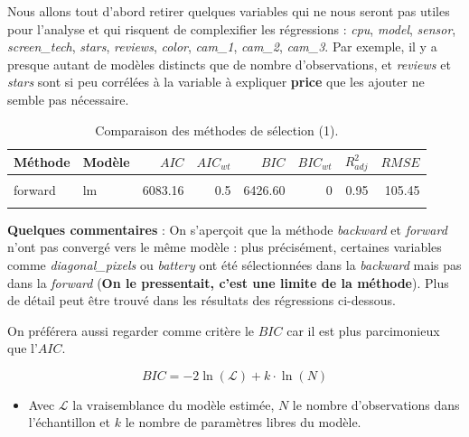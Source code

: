 \documentclass[
  12pt,
]{report}
\providecommand{\tightlist}{%
  \setlength{\itemsep}{0pt}\setlength{\parskip}{0pt}}\usepackage{longtable,booktabs,array}
\begin{document}
Nous allons tout d'abord retirer quelques variables qui ne nous seront
pas utiles pour l'analyse et qui risquent de complexifier les
régressions : \emph{cpu}, \emph{model}, \emph{sensor},
\emph{screen\_tech}, \emph{stars}, \emph{reviews}, \emph{color},
\emph{cam\_1}, \emph{cam\_2}, \emph{cam\_3}. Par exemple, il y a presque
autant de modèles distincts que de nombre d'observations, et
\emph{reviews} et \emph{stars} sont si peu corrélées à la variable à
expliquer \textbf{price} que les ajouter ne semble pas nécessaire.

\begin{table}[!h]

\caption{\label{tab:kable_perf}Comparaison des méthodes de sélection (1).}
\centering
\begin{tabular}[t]{llrrrrrr}
\toprule
\textbf{Méthode} & \textbf{Modèle} & \textbf{$AIC$} & \textbf{$AIC_{wt}$} & \textbf{$BIC$} & \textbf{$BIC_{wt}$} & \textbf{$R^2_{adj}$} & \textbf{$RMSE$}\\
\midrule
\cellcolor{gray!6}{backward} & \cellcolor{gray!6}{lm} & \cellcolor{gray!6}{6083.16} & \cellcolor{gray!6}{0.5} & \cellcolor{gray!6}{6426.60} & \cellcolor{gray!6}{0} & \cellcolor{gray!6}{0.95} & \cellcolor{gray!6}{105.45}\\
forward & lm & 6083.16 & 0.5 & 6426.60 & 0 & 0.95 & 105.45\\
\cellcolor{gray!6}{genetic} & \cellcolor{gray!6}{lm} & \cellcolor{gray!6}{6229.89} & \cellcolor{gray!6}{0.0} & \cellcolor{gray!6}{6363.91} & \cellcolor{gray!6}{1} & \cellcolor{gray!6}{0.92} & \cellcolor{gray!6}{135.85}\\
\bottomrule
\end{tabular}
\end{table}

\textbf{Quelques commentaires} : On s'aperçoit que la méthode
\emph{backward} et \emph{forward} n'ont pas convergé vers le même modèle
: plus précisément, certaines variables comme \emph{diagonal\_pixels} ou
\emph{battery} ont été sélectionnées dans la \emph{backward} mais pas
dans la \emph{forward} (\textbf{On le pressentait, c'est une limite de
la méthode}). Plus de détail peut être trouvé dans les résultats des
régressions ci-dessous.

On préférera aussi regarder comme critère le \(BIC\) car il est plus
parcimonieux que l'\(AIC\).

\[ BIC = -2\ln(\mathcal{L}) + k \cdot \ln(N) \]

\begin{itemize}
\tightlist
\item
  Avec \(\mathcal{L}\) la vraisemblance du modèle estimée, \(N\) le
  nombre d'observations dans l'échantillon et \(k\) le nombre de
  paramètres libres du modèle.
\end{itemize}
\end{document}
